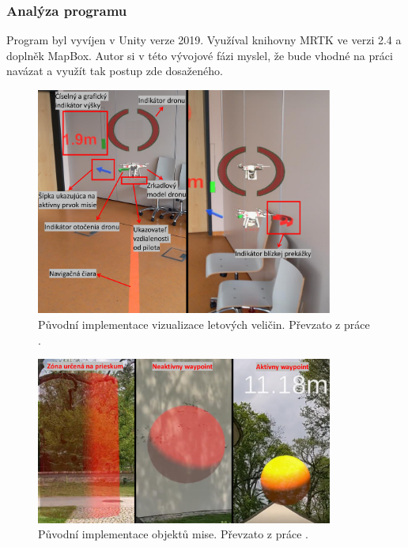 \subsubsection{Analýza programu}
Program byl vyvíjen v Unity verze 2019. Využíval knihovny MRTK ve verzi 2.4 a doplněk MapBox. Autor si v této vývojové fázi myslel, že bude vhodné na práci navázat a využít tak postup zde dosaženého.


\begin{figure}[H]
	\centering
	\includegraphics[width=0.87\textwidth]{obrazky-figures/navrh/prevUiDesign.pdf}
	\caption{Původní implementace vizualizace letových veličin. Převzato z práce \cite{KyjacMartin2022Vnpp}.}
	\label{pic:prevUiDesign}
\end{figure}

\begin{figure}[H]
	\centering
	\includegraphics[width=0.87\textwidth]{obrazky-figures/navrh/prevMisionObject.pdf}
	\caption{Původní implementace objektů mise. Převzato z práce \cite{KyjacMartin2022Vnpp}.}
	\label{pic:prevMisionObject}
\end{figure}

